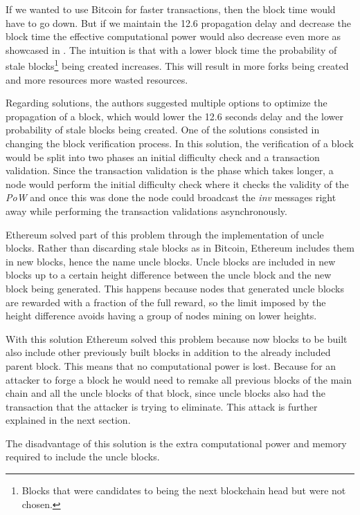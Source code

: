 If we wanted to use Bitcoin for faster transactions, then the block time would have to go down. But if we maintain the 12.6 propagation delay and decrease the block time the effective computational power would also decrease even more as showcased in \cite{ethereumblog}. The intuition is that with a lower block time the probability of stale blocks\footnote{Blocks that were candidates to being the next blockchain head but were not chosen.} being created increases. This will result in more forks being created and more resources more wasted resources.

Regarding solutions, the authors suggested multiple options to optimize the propagation of a block, which would lower the 12.6 seconds delay and the lower probability of stale blocks being created. One of the solutions consisted in changing the block verification process. In this solution, the verification of a block would be split into two phases an initial difficulty check and a transaction validation. Since the transaction validation is the phase which takes longer, a node would perform the initial difficulty check where it checks the validity of the \textit{PoW} and once this was done the node could broadcast the \textit{inv} messages right away while performing the transaction validations asynchronously.

Ethereum solved part of this problem through the implementation of uncle blocks. Rather than discarding stale blocks as in Bitcoin, Ethereum includes them in new blocks, hence the name uncle blocks. Uncle blocks are included in new blocks up to a certain height difference between the uncle block and the new block being generated. This happens because nodes that generated uncle blocks are rewarded with a fraction of the full reward, so the limit imposed by the height difference avoids having a group of nodes mining on lower heights.

With this solution Ethereum solved this problem because now blocks to be built also include other previously built blocks in addition to the already included parent block. This means that no computational power is lost. Because for an attacker to forge a block he would need to remake all previous blocks of the main chain and all the uncle blocks of that block, since uncle blocks also had the transaction that the attacker is trying to eliminate. This attack is further explained in the next section.

The disadvantage of this solution is the extra computational power and memory required to include the uncle blocks.


